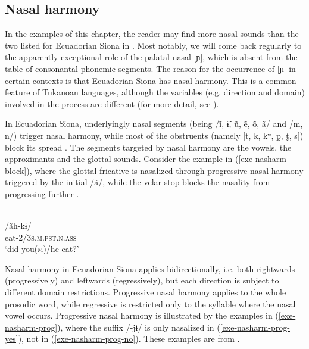 \documentclass[output=paper]{langscibook}
\begin{document}
\subsection{Nasal harmony}\label{sec-nasal}
In the examples of this chapter, the reader may find more nasal sounds than the two listed for Ecuadorian Siona in . Most notably, we will come back regularly to the apparently exceptional role of the palatal nasal [ɲ], which is absent from the table of consonantal phonemic segments. The reason for the occurrence of [ɲ] in certain contexts is that Ecuadorian Siona has nasal harmony. This is a common feature of  Tukanoan languages, although the variables (e.g. direction and domain) involved in the process are different (for more detail, see \citealt[124--125]{Bruil:2014}). 

In Ecuadorian Siona, underlyingly nasal segments (being /ĩ, ɨ̃, ũ, ẽ, õ, ã/ and /m, n/) trigger nasal harmony, while most of the obstruents (namely [t, k, kʷ, p̰, t̰, s]) block its spread \citep[126--127]{Bruil:2014}. The segments targeted by nasal harmony are the vowels, the approximants and the glottal sounds. Consider the example in (\ref{exe-nasharm-block}), where the glottal fricative is nasalized through progressive nasal harmony triggered by the initial /ã/, while the velar stop blocks the nasality from progressing further \citep[128]{Bruil:2014}.

\begin{exe}
\ex\label{exe-nasharm-block}
\glll [ãh̃.kɨ]\\
/ãh-kɨ/\\
eat-\textsc{2/3s.m.pst.n.ass}\\
\trans `did you(\textsc{m})/he eat?'
\end{exe}

\largerpage
Nasal harmony in Ecuadorian Siona applies bidirectionally, i.e. both rightwards (progressively) and leftwards (regressively), but each direction is subject to different domain restrictions. Progressive nasal harmony applies to the whole prosodic word, while regressive is restricted only to the syllable where the nasal vowel occurs. Progressive nasal harmony is illustrated by the examples in (\ref{exe-nasharm-prog}), where the suffix /-jɨ/ is only nasalized in (\ref{exe-nasharm-prog-yes}), not in (\ref{exe-nasharm-prog-no}). These examples are from \citet[125--126]{Bruil:2014}. 
\end{document}
